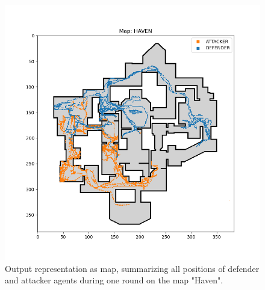 \begin{figure}[H]
	\centering
	\includegraphics[width=0.95\linewidth]{images/a04-comb-output}
	\caption[Output representation as map.]{Output representation as map, summarizing all positions 
		of defender and attacker agents during one round on the map "Haven".}
	\label{fig:ea:outputComb}
\end{figure}